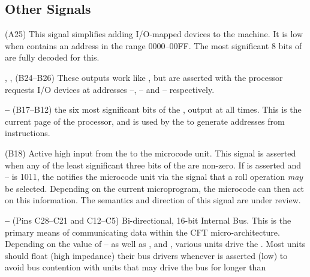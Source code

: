 \subsection{Other Signals}

\begin{description}
\item{\bfseries \SYSDEV} (A25) This signal simplifies adding I/O-mapped
  devices to the machine. It is low when \MAR{} contains an address in
  the range 0000–00FF. The most significant 8 bits of \MAR{} are fully
  decoded for this.
\item{\bfseries {}}, {\bfseries {}}, {\bfseries {}} (B24–B26) These
  outputs work like \SYSDEV{}, but are asserted with the processor
  requests I/O devices at addresses –,
  – and – respectively.
\item{\bfseries {}–} (B17–B12) the six most significant bits
  of the \PC, output at all times. This is the current page of the
  processor, and is used by the \AGL{} to generate addresses from
  instructions.
\item{\bfseries \ISROLL} (B18) Active high input from the \SBU{} to the
  microcode unit. This signal is asserted when any of the least
  significant three bits of the \IR{} are non-zero. If \ISROLL{} is
  asserted and – is \textsf{1011}, the \SBU{}
  notifies the microcode unit via the \SKIP{} signal that a roll
  operation {\em may\/} be selected. Depending on the current
  microprogram, the microcode can then act on this information. \NB
  The semantics and direction of this signal are under review.
\item{\bfseries {}–} (Pins C28–C21 and C12–C5)
  Bi-directional, 16-bit Internal Bus. This is the primary means of
  communicating data within the CFT micro-architecture. Depending on
  the value of – as well as \MEM, \IO{} and \READ,
  various units drive the \IBUS. Most units should float (high
  impedance) their bus drivers whenever \GP{} is asserted (low) to avoid
  bus contention with units that may drive the bus for longer than

\end{description}
